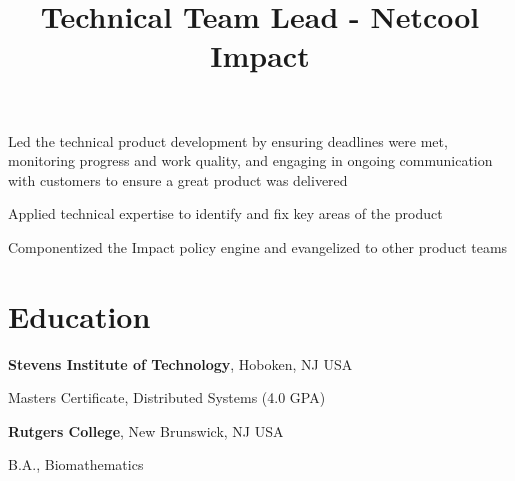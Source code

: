 \documentclass[margin,line]{resume}
\newenvironment{bullet-list}{
  \begin{list}{$\bullet$}{%
      \setlength{\itemsep}{0in}
      \setlength{\parsep}{0in} \setlength{\parskip}{0in}
      \setlength{\topsep}{0in} \setlength{\partopsep}{0in}
      \setlength{\leftmargin}{0.2in}}}{\end{list}}
\begin{document}
\begin{resume}
\title{Technical Team Lead - Netcool Impact}
\begin{position}
\vspace{-.3cm}
\begin{bullet-list}
\item Led the technical product development by ensuring deadlines were
met, monitoring progress and work quality, and engaging in ongoing communication
with customers to ensure a great product was delivered
\item Applied technical expertise to identify and fix key areas of the
product
\item Componentized the Impact policy engine and evangelized to other product
teams
\end{bullet-list}
\end{position}

\section{\sc Education}
{\bf Stevens Institute of Technology}, Hoboken, NJ USA\\
\vspace*{-.1in}
\begin{list1}
\item[] Masters Certificate, Distributed Systems  (4.0 GPA)
\end{list1}

{\bf Rutgers College}, New Brunswick, NJ USA\\
\vspace*{-.1in}
\begin{list1}
\item[] B.A., Biomathematics
\end{list1}


\end{resume}
\end{document}
